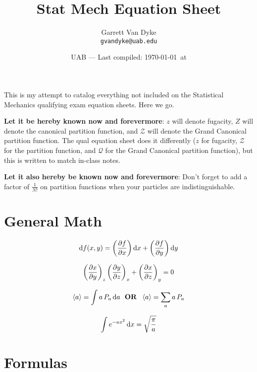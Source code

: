 \documentclass{article}
\title{Stat Mech Equation Sheet} %
\author{Garrett Van Dyke\\ \texttt{gvandyke@uab.edu}} %
\date{UAB --- Last compiled: \today\ at \currenttime} %
\begin{document}
\maketitle %



This is my attempt to catalog everything not included on the Statistical Mechanics qualifying exam equation sheets. Here we go. \medskip

\textbf{Let it be hereby known now and forevermore}: $z$ will denote fugacity, $Z$ will denote the canonical partition function, and $\mathcal{Z}$ will denote the Grand Canonical partition function. The qual equation sheet does it differently ($z$ for fugacity, $\mathcal{Z}$ for the partition function, and $\mathcal{Q}$ for the Grand Canonical partition function), but this is written to match in-class notes.\medskip

\textbf{Let it also hereby be known now and forevermore}: Don't forget to add a factor of $\frac{1}{N!}$ on partition functions when your particles are indistinguishable.

\section{General Math}

\begin{equation}
	\dif f(x,y)= \left(\pdv{f}{x}\right)\dif x + \left(\pdv{f}{y}\right)\dif y
\end{equation}

\begin{equation}
	\left(\pdv{x}{y}\right)_z\left(\pdv{y}{z}\right)_x+\left(\pdv{x}{z}\right)_y=0
\end{equation}

\begin{equation}
	\left\langle a \right\rangle=\int a \, P_a \dif a \; \textbf{ OR } \; \left\langle a \right\rangle=\sum_a a \, P_a
\end{equation}

\begin{equation}
	\int e^{-ax^2} \dif x = \sqrt{\frac{\pi}{a}}
\end{equation}


\section{Formulas}
\end{document}
